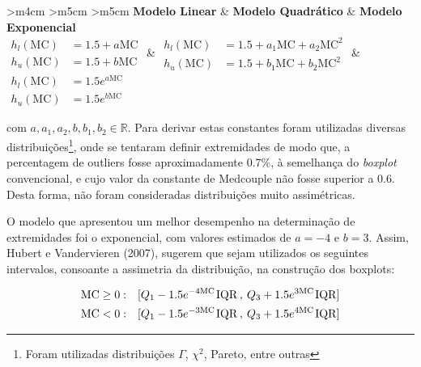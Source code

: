 \begin{center}
	\begin{tabular}{>{\centering\arraybackslash}m{4cm} >{\centering\arraybackslash}m{5cm} >{\centering\arraybackslash}m{5cm}}
		\textbf{Modelo Linear} & \textbf{Modelo Quadrático} & \textbf{Modelo Exponencial} \\
		\(\begin{aligned} 
			h_l(\text{MC}) &= 1.5 + a\text{MC} \\ 
			h_u(\text{MC}) &= 1.5 + b\text{MC} 
		\end{aligned}\) & 
		\(\begin{aligned} 
			h_l(\text{MC}) &= 1.5 + a_1\text{MC} + a_2\text{MC}^2\\ 
			h_u(\text{MC}) &= 1.5 + b_1\text{MC} + b_2\text{MC}^2
		\end{aligned}\) & 
		\(\begin{aligned} 
			h_l(\text{MC}) &= 1.5 e^{a\text{MC}} \\ 
			h_u(\text{MC}) &= 1.5 e^{b\text{MC}} 
		\end{aligned}\) \\
	\end{tabular}
\end{center}

com $a,a_1,a_2,b,b_1,b_2 \in \mathbb{R}$. Para derivar estas constantes foram utilizadas diversas distribuições\footnote{Foram utilizadas distribuições $\Gamma$, $\chi^2$, Pareto, entre outras}, onde se tentaram definir extremidades de modo que, a percentagem de outliers fosse aproximadamente 0.7\%, à semelhança do \textit{boxplot} convencional, e cujo valor da constante de Medcouple não fosse superior a 0.6. Desta forma, não foram consideradas distribuições muito assimétricas.

O modelo que apresentou um melhor desempenho na determinação de extremidades foi o exponencial, com valores estimados de $a = -4$ e $b = 3$. Assim, Hubert e Vandervieren (2007), sugerem que sejam utilizados os seguintes intervalos, consoante a assimetria da distribuição, na construção dos boxplots: 

\begin{align}
	\text{MC} \geq 0: & \quad [Q_1 -  1.5 e^{-4\text{MC}} \hspace{1px} \text{IQR} \hspace{2px} , \hspace{2px} Q_3 + 1.5 e^{3\text{MC}} \hspace{1px} \text{IQR}] 	\label{eq:medatual1} \\ \vspace{3px}
	\text{MC} < 0: & \quad [Q_1 -  1.5 e^{-3\text{MC}} \hspace{1px} \text{IQR} \hspace{2px} , \hspace{2px} Q_3 + 1.5 e^{4\text{MC}} \hspace{1px} \text{IQR}]
	\label{eq:medatual}
\end{align}

